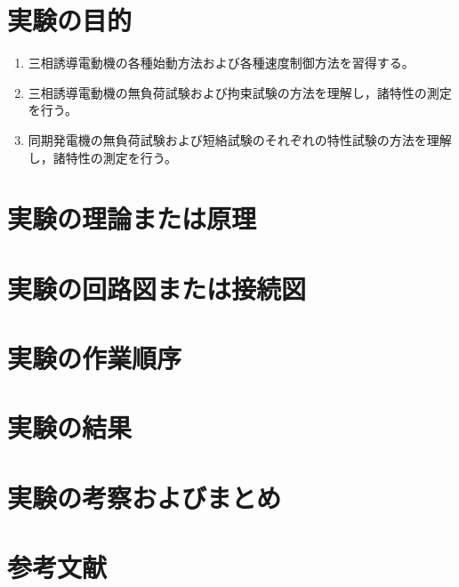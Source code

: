 \documentclass[a4paper,11pt,xelatex,ja=standard]{bxjsarticle}
\begin{document}
\section{実験の目的}
    \begin{enumerate}
        \item 三相誘導電動機の各種始動方法および各種速度制御方法を習得する。
        \item 三相誘導電動機の無負荷試験および拘束試験の方法を理解し，諸特性の測定を行う。
        \item 同期発電機の無負荷試験および短絡試験のそれぞれの特性試験の方法を理解し，諸特性の測定を行う。
    \end{enumerate}

\section{実験の理論または原理}
\section{実験の回路図または接続図}
\section{実験の作業順序}
\section{実験の結果}
\section{実験の考察およびまとめ}
\section{参考文献}
\end{document}
